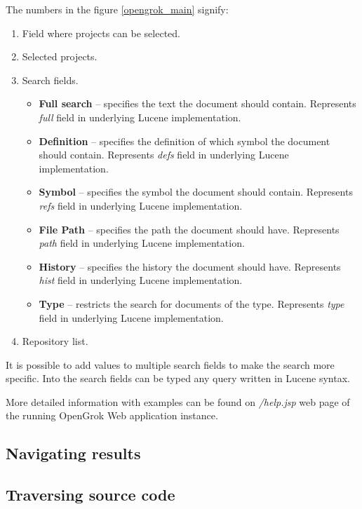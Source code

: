The numbers in the figure \ref{opengrok_main} signify:
\begin{enumerate}
    \item Field where projects can be selected.
    \item Selected projects.
    \item Search fields.
       \begin{itemize}
        \item \textbf{Full search} – specifies the text the document should contain. Represents \textit{full} field in
        underlying Lucene implementation.
        \item \textbf{Definition} – specifies the definition of which symbol the document should contain.
        Represents \textit{defs} field in underlying Lucene implementation.
        \item \textbf{Symbol} – specifies the symbol the document should contain.
        Represents \textit{refs} field in underlying Lucene implementation.
        \item \textbf{File Path} – specifies the path the document should have.
        Represents \textit{path} field in underlying Lucene implementation.
        \item \textbf{History} – specifies the history the document should have.
        Represents \textit{hist} field in underlying Lucene implementation.
        \item \textbf{Type} – restricts the search for documents of the type.
        Represents \textit{type} field in underlying Lucene implementation.
       \end{itemize}
    \item Repository list.
\end{enumerate}

It is possible to add values to multiple search fields to make the search more specific. Into the search fields can be
typed any query written in Lucene syntax.

More detailed information with examples can be found on \textit{/help.jsp} web page of the running OpenGrok Web application instance.

\subsection{Navigating results}

\subsection{Traversing source code}


